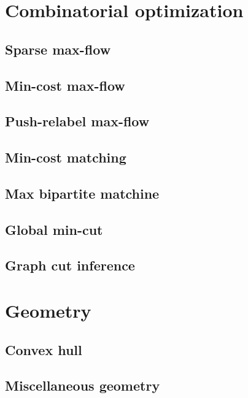 \section{Combinatorial optimization}
\subsection{Sparse max-flow}
\raggedbottom
\hrulefill
\subsection{Min-cost max-flow}
\raggedbottom
\hrulefill
\subsection{Push-relabel max-flow}
\raggedbottom
\hrulefill
\subsection{Min-cost matching}
\raggedbottom
\hrulefill
\subsection{Max bipartite matchine}
\raggedbottom
\hrulefill
\subsection{Global min-cut}
\raggedbottom
\hrulefill
\subsection{Graph cut inference}
\raggedbottom
\hrulefill

\section{Geometry}
\subsection{Convex hull}
\raggedbottom
\hrulefill
\subsection{Miscellaneous geometry}
\raggedbottom
\hrulefill
